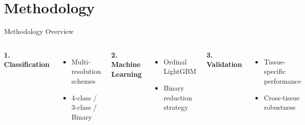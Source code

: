 \documentclass[aspectratio=169, 11pt, t]{beamer}
\begin{document}
\section{Methodology}

\begin{frame}{Methodology Overview}
    \vspace{0.2cm}
    \begin{columns}[T]
            \textbf{1. Classification}
            \vspace{0.25em}
            {\small
            \begin{itemize}
                \item Multi-resolution schemes
                \item 4-class / 3-class / Binary
            \end{itemize}}
            
            \textbf{2. Machine Learning}
            \vspace{0.25em}
            {\small
            \begin{itemize}
                \item Ordinal LightGBM
                \item Binary reduction strategy
            \end{itemize}}
            
            \textbf{3. Validation}
            \vspace{0.25em}
            {\small
            \begin{itemize}
                \item Tissue-specific performance
                \item Cross-tissue robustness
            \end{itemize}}
    \end{columns}
\end{frame}
\end{document}
